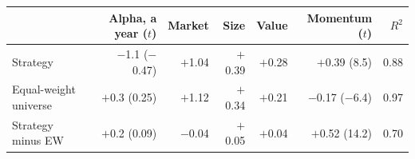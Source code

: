 \begin{tabular}{@{}lrrrrrr@{}}
\toprule
 & Alpha, a year ($t$) & Market & Size & Value & Momentum ($t$) & $R^2$ \\
\midrule
Strategy & $-$1.1 ($-$0.47) & $+$1.04 & $+$0.39 & $+$0.28 & $+$0.39 (8.5) & 0.88 \\
Equal-weight universe & $+$0.3 (0.25) & $+$1.12 & $+$0.34 & $+$0.21 & $-$0.17 ($-$6.4) & 0.97 \\
Strategy minus EW & $+$0.2 (0.09) & $-$0.04 & $+$0.05 & $+$0.04 & $+$0.52 (14.2) & 0.70 \\
\bottomrule
\end{tabular}
